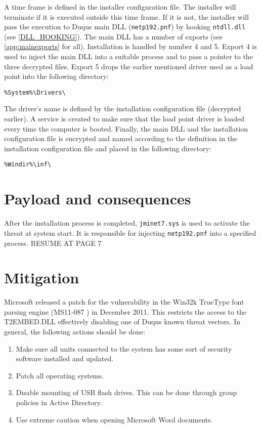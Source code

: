\documentclass[11pt,english,a4paper]{report}
\begin{document}
A time frame is defined in the installer configuration file. The installer will terminate if it is executed outside this time frame. If it is not, the installer will pass the execution to Duqus main DLL (\texttt{netp192.pnf}) by hooking \texttt{ntdll.dll} (see \ref{DLL_HOOKING}). The main DLL has a number of exports (see \ref{app:mainexports} for all). Installation is handled by number 4 and 5. Export 4 is used to inject the main DLL into a suitable process and to pass a pointer to the three decrypted files. Export 5 drops the earlier mentioned driver used as a load point into the following directory:
\begin{lstlisting}
%System%\Drivers\ 
\end{lstlisting}
The driver's name is defined by the installation configuration file (decrypted earlier). A service is created to make sure that the load point driver is loaded every time the computer is booted. Finally, the main DLL and the installation configuration file is encrypted and named according to the definition in the installation configuration file and placed in the following directory:
\begin{lstlisting}
%Windir%\inf\ 
\end{lstlisting}

\chapter{Payload and consequences}
After the installation process is completed, \texttt{jminet7.sys} is used to activate the threat at system start. It is responsible for injecting \texttt{netp192.pnf} into a specified process. RESUME AT PAGE 7

\chapter{Mitigation}
Microsoft released a patch for the vulnerability in the Win32k TrueType font parsing engine (MS11-087 \cite{TT_MSB}) in  December 2011. This restricts the access to the T2EMBED.DLL effectively disabling one of Duqus known threat vectors. In general, the following actions should be done:
 \begin{enumerate}
   \item Make sure all units connected to the system has some sort of security software installed and updated.
   \item Patch all operating systems. 
   \item Disable mounting of USB flash drives. This can be done through group policies in Active Directory.
   \item Use extreme caution when opening Microsoft Word documents.
  \end{enumerate}
\end{document}
